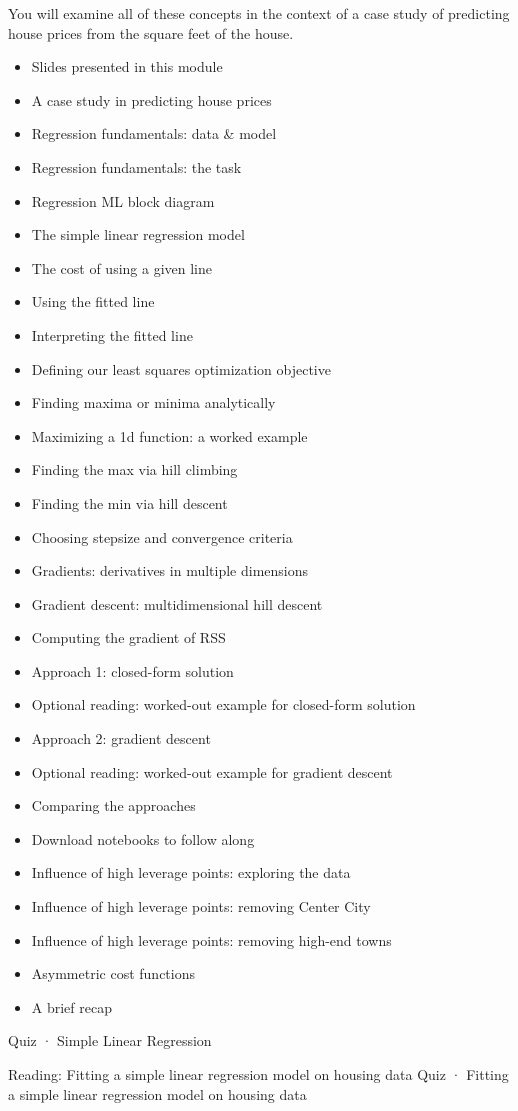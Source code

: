 You will examine all of these concepts in the context of a case study of predicting house prices from the square feet of the house.
\begin{itemize}
\item Slides presented in this module
\item A case study in predicting house prices
\item Regression fundamentals: data & model
\item Regression fundamentals: the task
\item Regression ML block diagram
\item The simple linear regression model
\item The cost of using a given line
\item Using the fitted line
\item Interpreting the fitted line
\item Defining our least squares optimization objective
\item Finding maxima or minima analytically
\item Maximizing a 1d function: a worked example
\item Finding the max via hill climbing
\item Finding the min via hill descent
\item Choosing stepsize and convergence criteria
\item Gradients: derivatives in multiple dimensions
\item Gradient descent: multidimensional hill descent
\item Computing the gradient of RSS
\item Approach 1: closed-form solution
\item Optional reading: worked-out example for closed-form solution
\item Approach 2: gradient descent
\item Optional reading: worked-out example for gradient descent
\item Comparing the approaches
\item Download notebooks to follow along
\item Influence of high leverage points: exploring the data
\item Influence of high leverage points: removing Center City
\item Influence of high leverage points: removing high-end towns
\item Asymmetric cost functions
\item A brief recap
\end{itemize}
Quiz · Simple Linear Regression
\item Reading: Fitting a simple linear regression model on housing data
Quiz · Fitting a simple linear regression model on housing data
